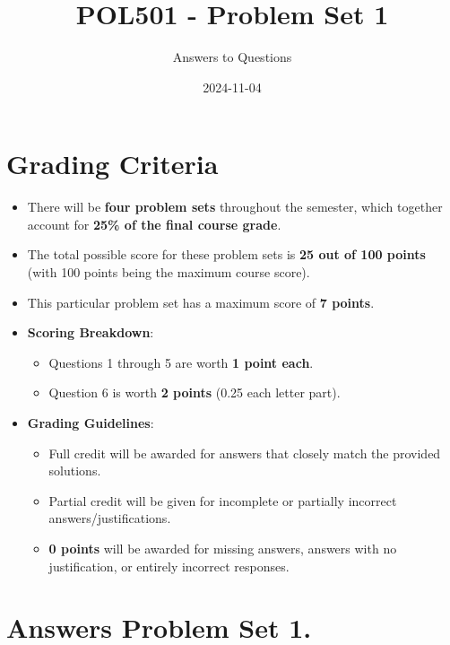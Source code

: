 \documentclass[
  11pt,
]{article}
\title{POL501 - Problem Set 1}
\author{Answers to Questions}
\date{2024-11-04}
\providecommand{\tightlist}{%
  \setlength{\itemsep}{0pt}\setlength{\parskip}{0pt}}
\begin{document}
\maketitle

{
\setcounter{tocdepth}{2}
\tableofcontents
}


\section{Grading Criteria}\label{grading-criteria}

\begin{itemize}
\tightlist
\item
  There will be \textbf{four problem sets} throughout the semester,
  which together account for \textbf{25\% of the final course grade}.
\item
  The total possible score for these problem sets is \textbf{25 out of
  100 points} (with 100 points being the maximum course score).
\item
  This particular problem set has a maximum score of \textbf{7 points}.
\item
  \textbf{Scoring Breakdown}:

  \begin{itemize}
  \tightlist
  \item
    Questions 1 through 5 are worth \textbf{1 point each}.
  \item
    Question 6 is worth \textbf{2 points} (0.25 each letter part).
  \end{itemize}
\item
  \textbf{Grading Guidelines}:

  \begin{itemize}
  \tightlist
  \item
    Full credit will be awarded for answers that closely match the
    provided solutions.
  \item
    Partial credit will be given for incomplete or partially incorrect
    answers/justifications.
  \item
    \textbf{0 points} will be awarded for missing answers, answers with
    no justification, or entirely incorrect responses.
  \end{itemize}
\end{itemize}

\newpage

\section{Answers Problem Set 1.}\label{answers-problem-set-1.}
\end{document}
